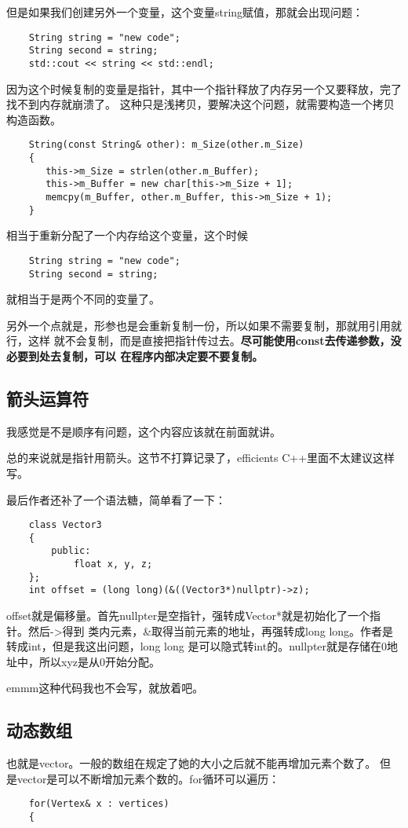 \documentclass{article}
\begin{document}
\begin{sloppypar}
但是如果我们创建另外一个变量，这个变量string赋值，那就会出现问题：
\begin{lstlisting}
    String string = "new code";
    String second = string;
    std::cout << string << std::endl;
\end{lstlisting}
因为这个时候复制的变量是指针，其中一个指针释放了内存另一个又要释放，完了找不到内存就崩溃了。
这种只是浅拷贝，要解决这个问题，就需要构造一个拷贝构造函数。
\begin{lstlisting}
	String(const String& other): m_Size(other.m_Size)
	{
	   this->m_Size = strlen(other.m_Buffer);
	   this->m_Buffer = new char[this->m_Size + 1];
	   memcpy(m_Buffer, other.m_Buffer, this->m_Size + 1);
	}
\end{lstlisting}
相当于重新分配了一个内存给这个变量，这个时候
\begin{lstlisting}
	String string = "new code";
    String second = string;
\end{lstlisting}
就相当于是两个不同的变量了。

另外一个点就是，形参也是会重新复制一份，所以如果不需要复制，那就用引用就行，这样
就不会复制，而是直接把指针传过去。\textbf{尽可能使用const去传递参数，没必要到处去复制，可以
在程序内部决定要不要复制。
}

\subsection{箭头运算符}
我感觉是不是顺序有问题，这个内容应该就在前面就讲。

总的来说就是指针用箭头。这节不打算记录了，efficients C++里面不太建议这样写。

最后作者还补了一个语法糖，简单看了一下：
\begin{lstlisting}
	class Vector3
	{
		public:
			float x, y, z;
	};
	int offset = (long long)(&((Vector3*)nullptr)->z);	
\end{lstlisting}
offset就是偏移量。首先nullpter是空指针，强转成Vector*就是初始化了一个指针。然后->得到
类内元素，\&取得当前元素的地址，再强转成long long。作者是转成int，但是我这出问题，long long
是可以隐式转int的。nullpter就是存储在0地址中，所以xyz是从0开始分配。

emmm这种代码我也不会写，就放着吧。

\subsection{动态数组}
也就是vector。一般的数组在规定了她的大小之后就不能再增加元素个数了。
但是vector是可以不断增加元素个数的。for循环可以遍历：
\begin{lstlisting}
	for(Vertex& x : vertices)
	{


\end{lstlisting}
\end{sloppypar}
\end{document}
